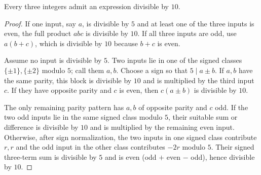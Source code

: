 \begin{theorem}\label{app:three10}
Every three integers admit an expression divisible by $10$.
\end{theorem}
\begin{proof}
If one input, say $a$, is divisible by $5$ and at least one of the three
inputs is even, the full product $abc$ is divisible by $10$.  If all three
inputs are odd, use $a(b+c)$, which is divisible by $10$ because $b+c$ is
even.

Assume no input is divisible by $5$.  Two inputs lie in one of the signed
classes $\{\pm1\},\{\pm2\}$ modulo $5$; call them $a,b$.  Choose a sign so
that $5\mid a\pm b$.  If $a,b$ have the same parity, this block is divisible
by $10$ and is multiplied by the third input $c$.  If they have opposite
parity and $c$ is even, then $c(a\pm b)$ is divisible by $10$.

The only remaining parity pattern has $a,b$ of opposite parity and $c$ odd.
If the two odd inputs lie in the same signed class modulo $5$, their suitable
sum or difference is divisible by $10$ and is multiplied by the remaining
even input.  Otherwise, after sign normalization, the two inputs in one signed
class contribute $r,r$ and the odd input in the other class contributes
$-2r$ modulo $5$.  Their signed three-term sum is divisible by $5$ and is
even (odd $+$ even $-$ odd), hence divisible by $10$.
\end{proof}

